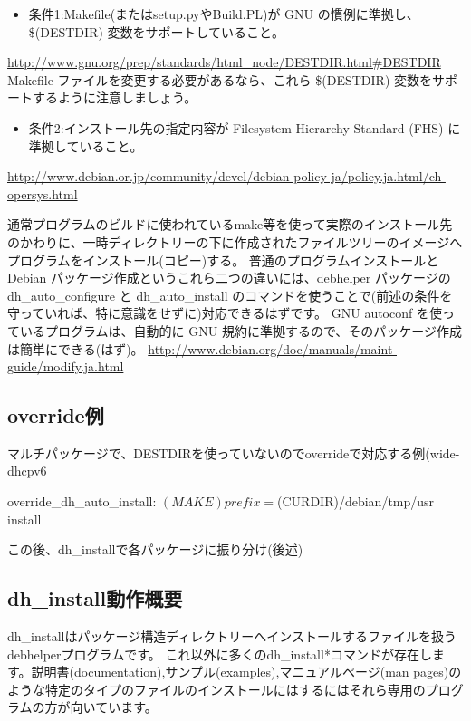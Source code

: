 \documentclass[mingoth,a4paper]{jsarticle}
\begin{document}
\begin{itemize}
\item 条件1:Makefile(またはsetup.pyやBuild.PL)が GNU の慣例に準拠し、\$(DESTDIR) 変数をサポートしていること。
\end{itemize}
\url{http://www.gnu.org/prep/standards/html\_node/DESTDIR.html\#DESTDIR}
\\
Makefile ファイルを変更する必要があるなら、これら \$(DESTDIR) 変数をサポートするように注意しましょう。
\begin{itemize}
\item 条件2:インストール先の指定内容が Filesystem Hierarchy Standard (FHS) に準拠していること。
\end{itemize}
\url{http://www.debian.or.jp/community/devel/debian-policy-ja/policy.ja.html/ch-opersys.html}

通常プログラムのビルドに使われているmake等を使って実際のインストール先のかわりに、一時ディレクトリーの下に作成されたファイルツリーのイメージへプログラムをインストール(コピー)する。
 普通のプログラムインストールとDebian パッケージ作成というこれら二つの違いには、debhelper パッケージの dh\_auto\_configure と dh\_auto\_install のコマンドを使うことで(前述の条件を守っていれば、特に意識をせずに)対応できるはずです。
GNU autoconf を使っているプログラムは、自動的に GNU 規約に準拠するので、そのパッケージ作成は簡単にできる(はず)。
\url{http://www.debian.org/doc/manuals/maint-guide/modify.ja.html}


\subsection[containsverbatim]{override例}
マルチパッケージで、DESTDIRを使っていないのでoverrideで対応する例(wide-dhcpv6
\begin{commandline}
override_dh_auto_install:
        $(MAKE) prefix=$(CURDIR)/debian/tmp/usr install
\end{commandline}
この後、dh\_installで各パッケージに振り分け(後述)


\subsection{dh\_install動作概要}

dh\_installはパッケージ構造ディレクトリーへインストールするファイルを扱うdebhelperプログラムです。
これ以外に多くのdh\_install*コマンドが存在します。説明書(documentation),サンプル(examples),マニュアルページ(man pages)のような特定のタイプのファイルのインストールにはするにはそれら専用のプログラムの方が向いています。
\end{document}
